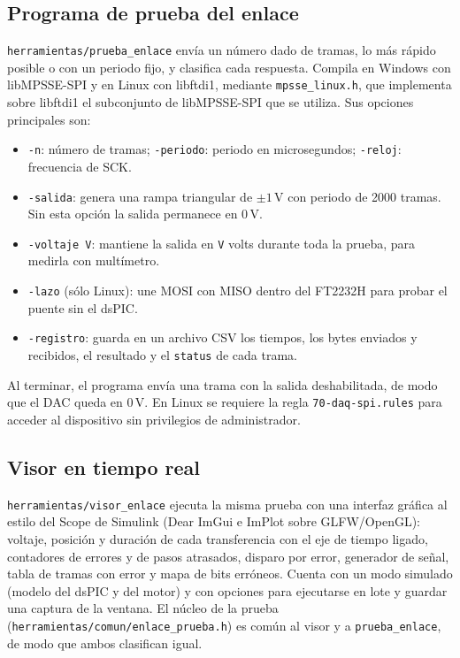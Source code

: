 \documentclass[11pt]{article}
\newcommand{\code}[1]{\texttt{#1}}
\begin{document}
\subsection{Programa de prueba del enlace}

\code{herramientas/prueba\_enlace} envía un número dado de tramas, lo más
rápido posible o con un periodo fijo, y clasifica cada respuesta. Compila en
Windows con libMPSSE-SPI y en Linux con libftdi1, mediante
\code{mpsse\_linux.h}, que implementa sobre libftdi1 el subconjunto de
libMPSSE-SPI que se utiliza. Sus opciones principales son:

\begin{itemize}
\item \code{-n}: número de tramas; \code{-periodo}: periodo en microsegundos;
  \code{-reloj}: frecuencia de SCK.
\item \code{-salida}: genera una rampa triangular de $\pm1$\,V con periodo de
  2000 tramas. Sin esta opción la salida permanece en 0\,V.
\item \code{-voltaje V}: mantiene la salida en \code{V} volts durante toda la
  prueba, para medirla con multímetro.
\item \code{-lazo} (sólo Linux): une MOSI con MISO dentro del FT2232H para
  probar el puente sin el dsPIC.
\item \code{-registro}: guarda en un archivo CSV los tiempos, los bytes
  enviados y recibidos, el resultado y el \code{status} de cada trama.
\end{itemize}

Al terminar, el programa envía una trama con la salida deshabilitada, de
modo que el DAC queda en 0\,V. En Linux se requiere la regla
\code{70-daq-spi.rules} para acceder al dispositivo sin privilegios de
administrador.

\subsection{Visor en tiempo real}

\code{herramientas/visor\_enlace} ejecuta la misma prueba con una interfaz
gráfica al estilo del Scope de Simulink (Dear ImGui e ImPlot sobre
GLFW/OpenGL): voltaje, posición y duración de cada transferencia con el eje
de tiempo ligado, contadores de errores y de pasos atrasados, disparo por
error, generador de señal, tabla de tramas con error y mapa de bits
erróneos. Cuenta con un modo simulado (modelo del dsPIC y del motor) y con
opciones para ejecutarse en lote y guardar una captura de la ventana. El
núcleo de la prueba (\code{herramientas/comun/enlace\_prueba.h}) es común al
visor y a \code{prueba\_enlace}, de modo que ambos clasifican igual.
\end{document}
